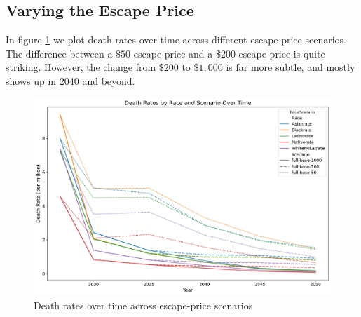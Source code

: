 \documentclass[a4paper]{article}
\theoremstyle{definition}
\theoremstyle{plain}
\begin{document}
\subsection{Varying the Escape Price}
In figure \ref{EscapePrice} we plot death rates over time across different escape-price scenarios.  The difference between a $\$50$ escape price and a $\$200$ escape price is quite striking.  However, the change from $\$200$ to $\$1,000$ is far more subtle, and mostly shows up in 2040 and beyond.

\begin{figure}
    \centering
    \includegraphics[width=1\linewidth]{Figures/Output/Compare_scenarios_compare-escape-price_GenX.jpg}
    \caption{Death rates over time across escape-price scenarios}
    \label{EscapePrice}
\end{figure}
\end{document}
